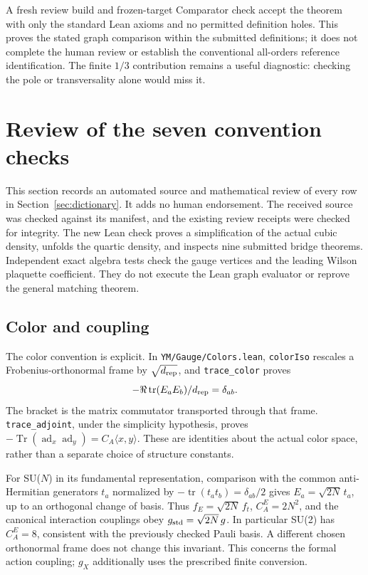 \documentclass[11pt]{article}
\newcommand{\tr}{\operatorname{tr}}
\newcommand{\Tr}{\operatorname{Tr}}
\newcommand{\ad}{\operatorname{ad}}
\newcommand{\code}[1]{{\small\nolinkurl{#1}}}
\begin{document}
A fresh review build and frozen-target Comparator check accept the theorem
with only the standard Lean axioms and no permitted definition holes.
This proves the stated graph comparison within the submitted definitions;
it does not complete the human review or establish the conventional
all-orders reference identification. The finite $1/3$ contribution remains
a useful diagnostic: checking the pole or transversality alone would miss it.

\section{Review of the seven convention checks}
\label{sec:completion}

This section records an automated source and mathematical review of every
row in Section~\ref{sec:dictionary}. It adds no human endorsement. The
received source was checked against its manifest, and the existing review
receipts were checked for integrity. The new Lean check proves a simplification
of the actual cubic density, unfolds the quartic density, and inspects nine
submitted bridge theorems. Independent exact algebra tests check the gauge
vertices and the leading Wilson plaquette coefficient. They do not execute
the Lean graph evaluator or reprove the general matching theorem.

\subsection{Color and coupling}

The color convention is explicit. In \code{YM/Gauge/Colors.lean},
\code{colorIso} rescales a Frobenius-orthonormal frame by
$\sqrt{d_{\rm rep}}$, and \code{trace_color} proves
\[
 -\Re\tr(E_aE_b)/d_{\rm rep}=\delta_{ab}.
\]
The bracket is the matrix commutator transported through that frame.
\code{trace_adjoint}, under the simplicity hypothesis, proves
$-\Tr(\ad_x\ad_y)=C_A\langle x,y\rangle$. These are identities about
the actual color space, rather than a separate choice of structure constants.

For SU($N$) in its fundamental representation, comparison with the common
anti-Hermitian generators $t_a$ normalized by
$-\tr(t_at_b)=\delta_{ab}/2$ gives $E_a=\sqrt{2N}\,t_a$, up to an
orthogonal change of basis. Thus $f_E=\sqrt{2N}\,f_t$,
$C_A^{E}=2N^2$, and the canonical interaction couplings obey
$g_{\rm std}=\sqrt{2N}\,g$. In particular SU(2) has $C_A^{E}=8$,
consistent with the previously checked Pauli basis. A different chosen
orthonormal frame does not change this invariant. This concerns the formal
action coupling; $g_X$ additionally uses the prescribed finite conversion.
\end{document}

